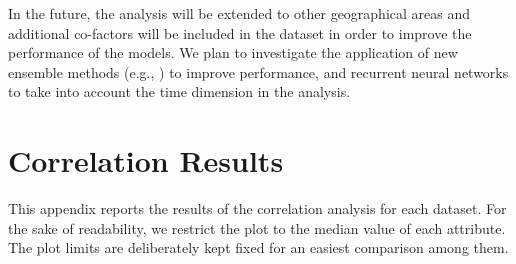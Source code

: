\documentclass[review]{elsarticle}
\begin{document}
In the future, the analysis will be extended to other geographical areas and additional co-factors will be included in the dataset in order to improve the performance of the models. We plan to investigate the application of new ensemble methods (e.g., \cite{Cornelio2021}) to improve performance, and recurrent neural networks to take into account the time dimension in the analysis.



%


\newpage
\appendix

\section{Correlation Results}
\label{app:corr_results}
This appendix reports the results of the correlation analysis for each dataset. For the sake of readability, we restrict the plot to the median value of each attribute. The plot limits are deliberately kept fixed for an easiest comparison among them.
\end{document}

